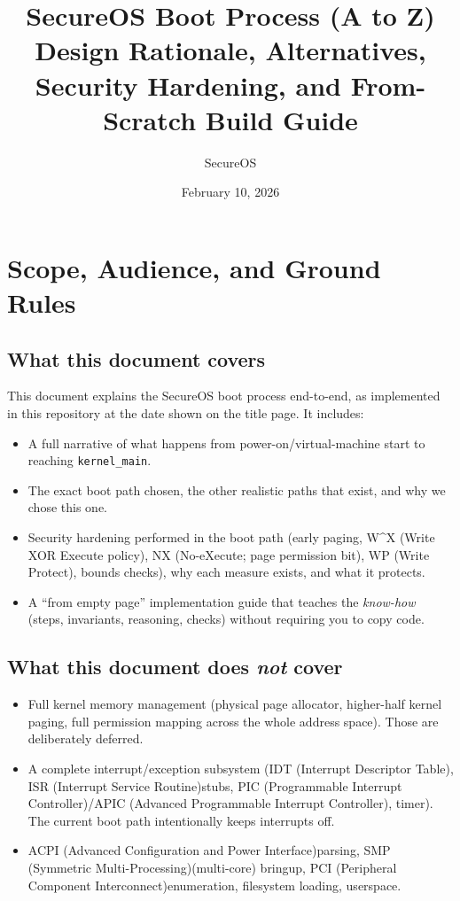 \documentclass[11pt]{article}
\title{SecureOS Boot Process (A to Z) \\ \large Design Rationale, Alternatives, Security Hardening, and From-Scratch Build Guide}
\author{SecureOS}
\date{February 10, 2026}
\newcommand{\ACPI}{ACPI (Advanced Configuration and Power Interface)}
\newcommand{\APIC}{APIC (Advanced Programmable Interrupt Controller)}
\newcommand{\IDT}{IDT (Interrupt Descriptor Table)}
\newcommand{\ISR}{ISR (Interrupt Service Routine)}
\newcommand{\NX}{NX (No-eXecute; page permission bit)}
\newcommand{\PCI}{PCI (Peripheral Component Interconnect)}
\newcommand{\PIC}{PIC (Programmable Interrupt Controller)}
\newcommand{\SMP}{SMP (Symmetric Multi-Processing)}
\newcommand{\WP}{WP (Write Protect)}
\newcommand{\WX}{W\textasciicircum X (Write XOR Execute policy)}
\begin{document}
\maketitle

\tableofcontents
\newpage

\section{Scope, Audience, and Ground Rules}

\subsection{What this document covers}
This document explains the SecureOS boot process end-to-end, as implemented in this repository at the date shown on the title page. It includes:
\begin{itemize}
  \item A full narrative of what happens from power-on/virtual-machine start to reaching \texttt{kernel\_main}.
  \item The exact boot path chosen, the other realistic paths that exist, and why we chose this one.
  \item Security hardening performed in the boot path (early paging, \WX, \NX, \WP, bounds checks), why each measure exists, and what it protects.
  \item A ``from empty page'' implementation guide that teaches the \emph{know-how} (steps, invariants, reasoning, checks) without requiring you to copy code.
\end{itemize}

\subsection{What this document does \emph{not} cover}
\begin{itemize}
  \item Full kernel memory management (physical page allocator, higher-half kernel paging, full permission mapping across the whole address space). Those are deliberately deferred.
  \item A complete interrupt/exception subsystem (\IDT, \ISR stubs, \PIC/\APIC, timer). The current boot path intentionally keeps interrupts off.
  \item \ACPI parsing, \SMP (multi-core) bringup, \PCI enumeration, filesystem loading, userspace.
\end{itemize}
\end{document}
